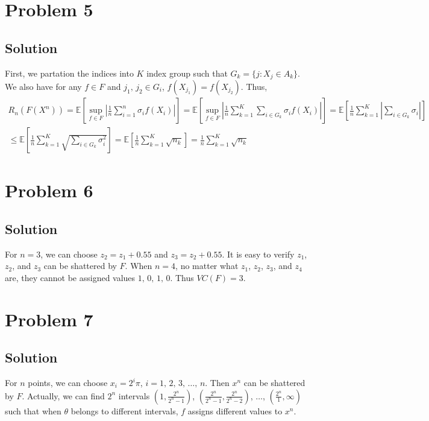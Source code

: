 \documentclass[11pt]{report}
\newcommand{\E}[1]{\mathbb{E}\left[#1\right]}
\begin{document}
\section*{Problem 5}
\subsection*{Solution}
First, we partation the indices into $K$ index group such that $G_k = \{j: X_j \in A_k\}$. We also have for any $f \in F$ and $j_1,\,j_2 \in G_i$, $f(X_{j_1}) = f(X_{j_2})$. Thus,
\begin{multline*}
  R_n(F(X^n)) = \E{\sup\limits_{f \in F} \left|\frac{1}{n}\sum_{i=1}^{n}\sigma_i f(X_i)\right|} = \E{\sup\limits_{f \in F} \left|\frac{1}{n}\sum_{k=1}^{K} \sum_{i \in G_k} \sigma_i f(X_i)\right|} = \E{\frac{1}{n}\sum_{k=1}^{K} \left|\sum_{i \in G_k} \sigma_i\right|} \\\leq \E{\frac{1}{n}\sum_{k=1}^{K} \sqrt{\sum_{i \in G_k} \sigma_i^2}} = \E{\frac{1}{n}\sum_{k=1}^{K} \sqrt{n_k}} = \frac{1}{n}\sum_{k=1}^{K} \sqrt{n_k}
\end{multline*}
\section*{Problem 6}
\subsection*{Solution}
For $n = 3$, we can choose $z_2 = z_1 + 0.55$ and $z_3 = z_2 + 0.55$. It is easy to verify $z_1$, $z_2$, and $z_3$ can be shattered by $F$. When $n = 4$, no matter what $z_1$, $z_2$, $z_3$, and $z_4$ are, they cannot be assigned values $1,\,0,\,1,\,0$. Thus $VC(F) = 3$.
\section*{Problem 7}
\subsection*{Solution}
For $n$ points, we can choose $x_i = 2^i \pi$, $i=1,\,2,\,3,\,\dots,\,n$. Then $x^n$ can be shattered by $F$. Actually, we can find $2^n$ intervals $(1, \frac{2^n}{2^n-1})$, $(\frac{2^n}{2^n-1}, \frac{2^n}{2^n-2})$, $\dots$, $(\frac{2^n}{1}, \infty)$ such that when $\theta$ belongs to different intervals, $f$ assigns different values to $x^n$.
\end{document}
